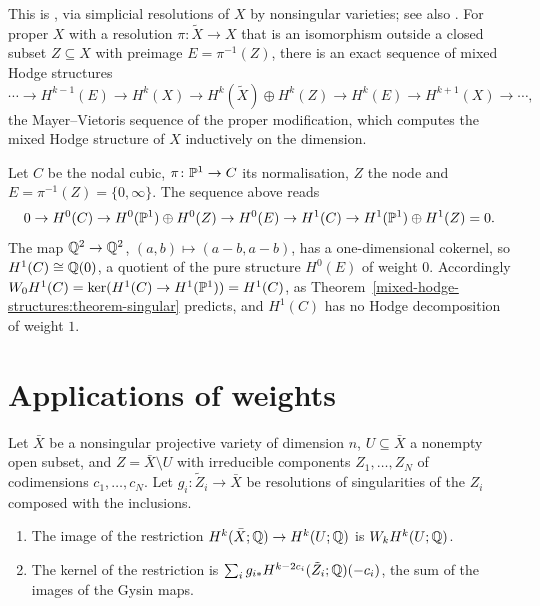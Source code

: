 This is \cite{deligne-hodge-3}, via simplicial resolutions of $X$ by nonsingular varieties; see also \cite[Chapter 5]{peters-steenbrink}. For proper $X$ with a resolution $\pi \colon \tilde X \to X$ that is an
isomorphism outside a closed subset $Z \subseteq X$ with preimage $E = \pi^{-1}(Z)$, there is an exact sequence of mixed Hodge structures
\[
\cdots \to H^{k-1}(E) \to H^k(X) \to H^k(\tilde X) \oplus H^k(Z) \to H^k(E) \to H^{k+1}(X) \to \cdots,
\]
the Mayer--Vietoris sequence of the proper modification, which computes the mixed Hodge structure of $X$ inductively on the dimension.

\begin{example}\label{mixed-hodge-structures:example-nodal}
Let $C$ be the nodal cubic, $\pi \colon \mathbb{P}^1 \to C$ its normalisation, $Z$ the node and $E = \pi^{-1}(Z) = \{0, \infty\}$. The sequence above reads
\[
0 \to H^0(C) \to H^0(\mathbb{P}^1) \oplus H^0(Z) \to H^0(E) \to H^1(C) \to H^1(\mathbb{P}^1) \oplus H^1(Z) = 0.
\]
The map $\mathbb{Q}^2 \to \mathbb{Q}^2$, $(a, b) \mapsto (a - b, a - b)$, has a one-dimensional cokernel, so $H^1(C) \cong \mathbb{Q}(0)$, a quotient of the pure structure $H^0(E)$ of weight $0$. Accordingly
$W_0H^1(C) = \ker(H^1(C) \to H^1(\mathbb{P}^1)) = H^1(C)$, as Theorem~\ref{mixed-hodge-structures:theorem-singular} predicts, and $H^1(C)$ has no Hodge decomposition of weight $1$.
\end{example}

\section{Applications of weights}\label{mixed-hodge-structures:section-applications}

\begin{corollary}\label{mixed-hodge-structures:corollary-restriction}
Let $\bar X$ be a nonsingular projective variety of dimension $n$, $U \subseteq \bar X$ a nonempty open subset, and $Z = \bar X \setminus U$ with irreducible components $Z_1, \ldots, Z_N$ of codimensions
$c_1, \ldots, c_N$. Let $g_i \colon \tilde Z_i \to \bar X$ be resolutions of singularities of the $Z_i$ composed with the inclusions.
\begin{enumerate}
\item The image of the restriction $H^k(\bar X; \mathbb{Q}) \to H^k(U; \mathbb{Q})$ is $W_kH^k(U; \mathbb{Q})$.
\item The kernel of the restriction is $\sum_ig_{i*}H^{k-2c_i}(\tilde Z_i; \mathbb{Q})(-c_i)$, the sum of the images of the Gysin maps.
\end{enumerate}
\end{corollary}

